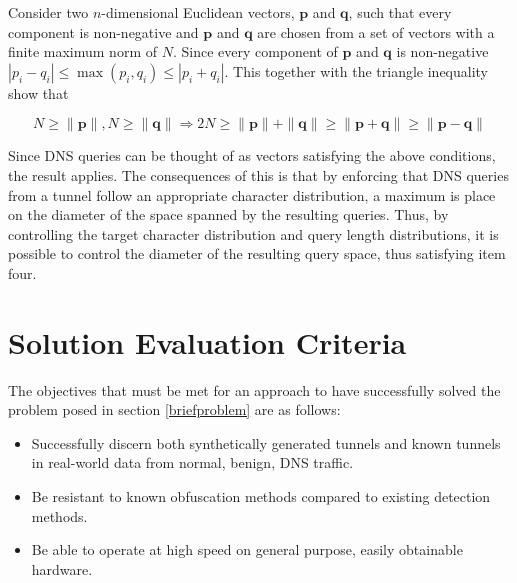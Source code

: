 \documentclass[12pt]{report}
\theoremstyle{remark}
\theoremstyle{definition}
\theoremstyle{definition}
\theoremstyle{definition}
\begin{document}

Consider two $n$-dimensional Euclidean vectors, $\mathbf p$ and $\mathbf q$,
such that every component is non-negative and $\mathbf p$ and $\mathbf q$ are
chosen from a set of vectors with a finite maximum norm of $N$. Since every
component of $\mathbf p$ and $\mathbf q$ is non-negative
$|p_i-q_i|\leq\max{(p_i,q_i)}\leq|p_i+q_i|$. This together with the triangle
inequality show that

\[N\geq\|\mathbf p\|,N\geq\|\mathbf q\|\Rightarrow 2N\geq\|\mathbf p\|+\|\mathbf q\|\geq\|\mathbf p+\mathbf q\|\geq\|\mathbf p-\mathbf q\|\]

Since DNS queries can be thought of as vectors satisfying the above conditions,
the result applies. The consequences of this is that by enforcing that DNS
queries from a tunnel follow an appropriate character distribution, a maximum is
place on the diameter of the space spanned by the resulting queries. Thus, by
controlling the target character distribution and query length distributions, it
is possible to control the diameter of the resulting query space, thus
satisfying item four.

\section{Solution Evaluation Criteria} The objectives that must be met for an
approach to have successfully solved the problem posed in section
\ref{briefproblem} are as follows:

\begin{itemize} \item Successfully discern both synthetically generated tunnels
and known tunnels in real-world data from normal, benign, DNS traffic. \item Be
resistant to known obfuscation methods compared to existing detection methods.
\item Be able to operate at high speed on general purpose, easily obtainable
hardware.
\end{itemize}
\end{document}
